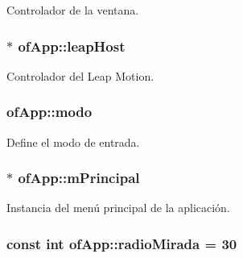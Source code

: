 Controlador de la ventana. 

\hypertarget{classof_app_aad56a9a303eb2d7becdba5ab7c117322}{}
\subsubsection[{leap\+Host}]{$\ast$ of\+App\+::leap\+Host\hspace{0.3cm}{\ttfamily [private]}}\label{classof_app_aad56a9a303eb2d7becdba5ab7c117322}


Controlador del Leap Motion. 

\hypertarget{classof_app_a8b4789de524f7b1376a44dc6caba6cb9}{}
\subsubsection[{modo}]{ of\+App\+::modo\hspace{0.3cm}{\ttfamily [private]}}\label{classof_app_a8b4789de524f7b1376a44dc6caba6cb9}


Define el modo de entrada. 

\hypertarget{classof_app_a9ba8bf05bd3a0932461179f47759b83d}{}
\subsubsection[{m\+Principal}]{$\ast$ of\+App\+::m\+Principal\hspace{0.3cm}{\ttfamily [private]}}\label{classof_app_a9ba8bf05bd3a0932461179f47759b83d}


Instancia del menú principal de la aplicación. 

\hypertarget{classof_app_a92c5745a3f00e98470f2d6d7287da213}{}
\subsubsection[{radio\+Mirada}]{\setlength{\rightskip}{0pt plus 5cm}const int of\+App\+::radio\+Mirada = 30\hspace{0.3cm}{\ttfamily [private]}}\label{classof_app_a92c5745a3f00e98470f2d6d7287da213}


